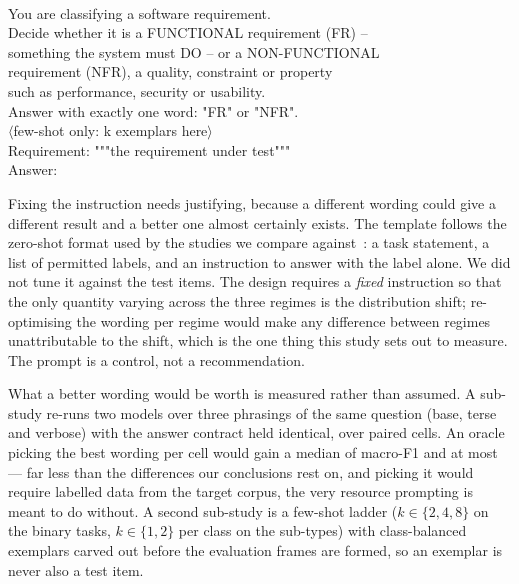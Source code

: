 \documentclass[conference]{IEEEtran}
\newcommand{\Fm}{macro-F1}
\begin{document}
{\scriptsize\ttfamily\raggedright
\vspace{2pt}\noindent\hrulefill\\[1.5pt]
You are classifying a software requirement.\\
Decide whether it is a FUNCTIONAL requirement (FR) --\\
something the system must DO -- or a NON-FUNCTIONAL\\
requirement (NFR), a quality, constraint or property\\
such as performance, security or usability.\\
Answer with exactly one word: "FR" or "NFR".\\[1.5pt]
$\langle$few-shot only: k exemplars here$\rangle$\\[1.5pt]
Requirement: """the requirement under test"""\\
Answer:\\[1.5pt]
\noindent\hrulefill\vspace{2pt}}

Fixing the instruction needs justifying, because a different wording could give a
different result and a better one almost certainly exists. The template follows
the zero-shot format used by the studies we compare
against~\cite{binkhonain2025,alhoshan2025,tang2025}: a task statement, a list of
permitted labels, and an instruction to answer with the label alone. We did not
tune it against the test items. The design requires a \emph{fixed} instruction so
that the only quantity varying across the three regimes is the distribution
shift; re-optimising the wording per regime would make any difference between
regimes unattributable to the shift, which is the one thing this study sets out
to measure. The prompt is a control, not a recommendation.

What a better wording would be worth is measured rather than assumed. A sub-study
re-runs two models over three phrasings of the same question (base, terse and
verbose) with the answer contract held identical, over \nNpsCells{} paired cells.
An oracle picking the best wording per cell would gain a median of \nOracleMed{}
\Fm{} and at most \nOracleMax{} --- far less than the differences our conclusions
rest on, and picking it would require labelled data from the target corpus, the
very resource prompting is meant to do without. A second sub-study is a few-shot
ladder ($k \in \{2,4,8\}$ on the binary tasks, $k \in \{1,2\}$ per class on the
sub-types) with class-balanced exemplars carved out before the evaluation frames
are formed, so an exemplar is never also a test item.
\end{document}
